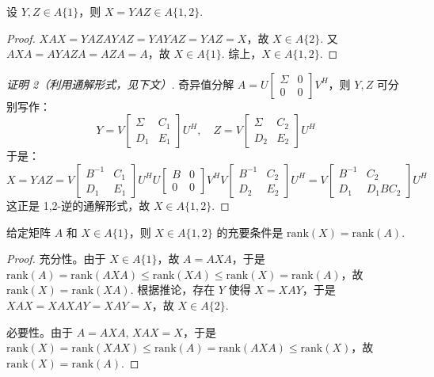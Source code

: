 \begin{theorem}
设 $Y,Z\in A\{1\}$，则 $X=YAZ\in A\{1,2\}$.
\end{theorem}
\begin{proof}
$XAX=YAZAYAZ=YAYAZ=YAZ=X$，故 $X\in A\{2\}$. 又 $AXA=AYAZA=AZA=A$，故 $X\in A\{1\}$. 综上，$X\in A\{1,2\}$.
\end{proof}
\begin{proof}[证明 2（利用通解形式，见下文）]
奇异值分解 $A=U\begin{bmatrix}\Sigma&0\\0&0\end{bmatrix}V^H$，则 $Y,Z$ 可分别写作：
\[
    Y=V\begin{bmatrix}\Sigma&C_1\\D_1&E_1\end{bmatrix}U^H,\quad Z=V\begin{bmatrix}\Sigma&C_2\\D_2&E_2\end{bmatrix}U^H
\]
于是：
\[
    X=YAZ=V\begin{bmatrix}B^{-1}&C_1\\D_1&E_1\end{bmatrix}U^HU\begin{bmatrix}B&0\\0&0\end{bmatrix}V^HV\begin{bmatrix}B^{-1}&C_2\\D_2&E_2\end{bmatrix}U^H=V\begin{bmatrix}B^{-1}&C_2\\D_1&D_1BC_2\end{bmatrix}U^H
\]
这正是 1,2-逆的通解形式，故 $X\in A\{1,2\}$.
\end{proof}

\begin{theorem}
给定矩阵 $A$ 和 $X\in A\{1\}$，则 $X\in A\{1,2\}$ 的充要条件是 $\text{rank}(X)=\text{rank}(A)$.
\end{theorem}
\begin{proof}
充分性。由于 $X\in A\{1\}$，故 $A=AXA$，于是 $\text{rank}(A)=\text{rank}(AXA)\leq\text{rank}(XA)\leq\text{rank}(X)=\text{rank}(A)$，故 $\text{rank}(X)=\text{rank}(XA)$. 根据推论，存在 $Y$ 使得 $X=XAY$，于是 $XAX=XAXAY=XAY=X$，故 $X\in A\{2\}$.

必要性。由于 $A=AXA,\,XAX=X$，于是 $\text{rank}(X)=\text{rank}(XAX)\leq\text{rank}(A)=\text{rank}(AXA)\leq\text{rank}(X)$，故 $\text{rank}(X)=\text{rank}(A)$.
\end{proof}

